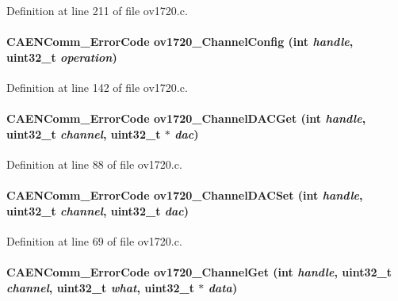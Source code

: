 Definition at line 211 of file ov1720.c.
\paragraph[{ov1720\_\-ChannelConfig}]{\setlength{\rightskip}{0pt plus 5cm}CAENComm\_\-ErrorCode ov1720\_\-ChannelConfig (int {\em handle}, \/  uint32\_\-t {\em operation})}\hfill\label{ov1720drv_8h_ae92af290a5ff93f84ac31298c9c6fc60}


Definition at line 142 of file ov1720.c.
\paragraph[{ov1720\_\-ChannelDACGet}]{\setlength{\rightskip}{0pt plus 5cm}CAENComm\_\-ErrorCode ov1720\_\-ChannelDACGet (int {\em handle}, \/  uint32\_\-t {\em channel}, \/  uint32\_\-t $\ast$ {\em dac})}\hfill\label{ov1720drv_8h_a7603f3480c25130fdf3341c539f736cf}


Definition at line 88 of file ov1720.c.
\paragraph[{ov1720\_\-ChannelDACSet}]{\setlength{\rightskip}{0pt plus 5cm}CAENComm\_\-ErrorCode ov1720\_\-ChannelDACSet (int {\em handle}, \/  uint32\_\-t {\em channel}, \/  uint32\_\-t {\em dac})}\hfill\label{ov1720drv_8h_ac1054ea39de55b9c40022120737f338d}


Definition at line 69 of file ov1720.c.
\paragraph[{ov1720\_\-ChannelGet}]{\setlength{\rightskip}{0pt plus 5cm}CAENComm\_\-ErrorCode ov1720\_\-ChannelGet (int {\em handle}, \/  uint32\_\-t {\em channel}, \/  uint32\_\-t {\em what}, \/  uint32\_\-t $\ast$ {\em data})}\hfill\label{ov1720drv_8h_a994ae975810199e601a80259fd19a53c}


